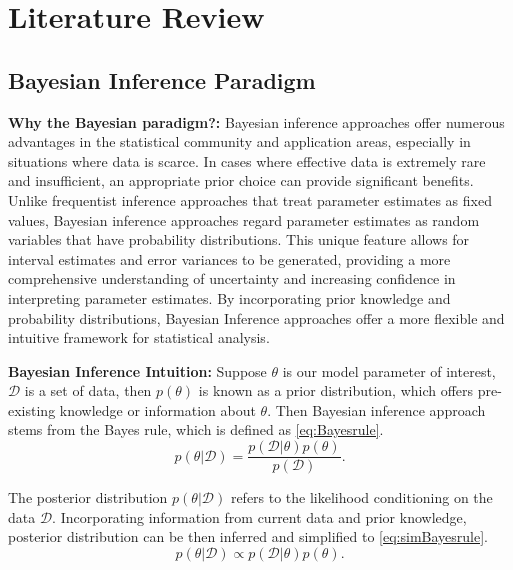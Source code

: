 \chapter{Literature Review}
\label{Chapter2}

\section{Bayesian Inference Paradigm}
\label{bayeisanP}
\textbf{Why the Bayesian paradigm?:}
Bayesian inference approaches offer numerous advantages in the statistical community and application areas, especially in situations where data is scarce. In cases where effective data is extremely rare and insufficient, an appropriate prior choice can provide significant benefits. Unlike frequentist inference approaches that treat parameter estimates as fixed values, Bayesian inference approaches regard parameter estimates as random variables that have probability distributions. This unique feature allows for interval estimates and error variances to be generated, providing a more comprehensive understanding of uncertainty and increasing confidence in interpreting parameter estimates. By incorporating prior knowledge and probability distributions, Bayesian Inference approaches offer a more flexible and intuitive framework for statistical analysis.

\noindent 
\textbf{Bayesian Inference Intuition:}
Suppose $\theta$ is our model parameter of interest, $\mathcal{D}$ is a set of data, then $p(\theta)$ is known as a prior distribution, which offers pre-existing knowledge or information about $\theta$.
Then Bayesian inference approach stems from the Bayes rule, which is defined as \autoref{eq:Bayesrule}. 
\begin{equation}
	p(\theta|\mathcal{D}) = \frac{p(\mathcal{D}|\theta)p(\theta)}{p(\mathcal{D})}.
	\label{eq:Bayesrule}
\end{equation}

\noindent 
The posterior distribution $p(\theta|\mathcal{D})$ refers to the likelihood conditioning on the data $\mathcal{D}$.
Incorporating information from current data and prior knowledge, posterior distribution can be then inferred and simplified to \autoref{eq:simBayesrule}.
\begin{equation}
	p(\theta|\mathcal{D}) \propto p(\mathcal{D}|\theta)p(\theta).
	\label{eq:simBayesrule}
\end{equation}


